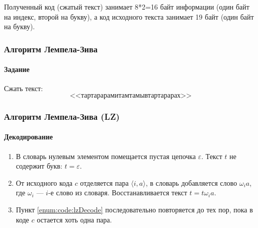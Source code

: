 Полученный код (сжатый текст) занимает 8*2=16 байт информации (один байт на индекс, второй на букву), а код исходного текста занимает 19 байт (один байт на букву).

\begin{frame}
    \frametitle{Алгоритм Лемпела-Зива}
    \framesubtitle{Задание}
    
    Сжать текст:
    \[
        \text{<<тартарарамитамтамывтартарарах>>}
    \]
\end{frame}

\begin{frame}
    \frametitle{Алгоритм Лемпела-Зива (LZ)}
    \framesubtitle{Декодирование}

    \begin{enumerate}
        \item В словарь нулевым элементом помещается пустая цепочка $\varepsilon$. Текст $t$ не содержит букв: $t=\varepsilon$.
        
        \item\label{enum:code:lzDecode} От исходного кода $c$ отделяется пара $\langle i,a\rangle$, в словарь добавляется слово $\omega_i a$, где $\omega_i$ --- $i$-е слово из словаря. Восстанавливается текст $t=t\omega_i a$.
        
        \item Пункт \ref{enum:code:lzDecode} последовательно повторяется до тех пор, пока в коде $c$ остается хоть одна пара.
    \end{enumerate}
\end{frame}

